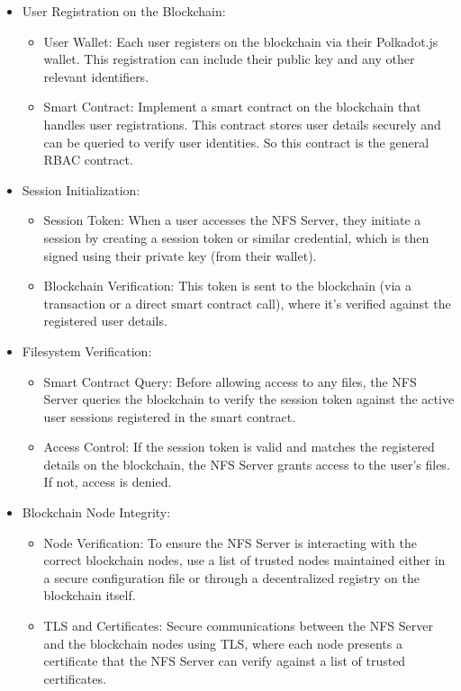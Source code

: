 \documentclass{tufte-handout}
\begin{document}
\begin{itemize}
\item User Registration on the Blockchain:
\begin{itemize}
    \item User Wallet: Each user registers on the blockchain via their Polkadot.js wallet. This registration can include their public key and any other relevant identifiers.
    \item Smart Contract: Implement a smart contract on the blockchain that handles user registrations. This contract stores user details securely and can be queried to
verify user identities. So this contract is the general RBAC contract.
\end{itemize}
\item Session Initialization:
\begin{itemize}
    \item Session Token: When a user accesses the NFS Server, they initiate a session by creating a session token or similar credential, which is then signed using their
    private key (from their wallet).
    \item Blockchain Verification: This token is sent to the blockchain (via a transaction or a direct smart contract call), where it's verified against the registered
    user details.
\end{itemize}
\item Filesystem Verification:
\begin{itemize}
    \item Smart Contract Query: Before allowing access to any files, the NFS Server queries the blockchain to verify the session token against the active user sessions
    registered in the smart contract.
    \item Access Control: If the session token is valid and matches the registered details on the blockchain, the NFS Server grants access to the user's files. If not,
    access is denied.
\end{itemize}
\item Blockchain Node Integrity:
\begin{itemize}
    \item Node Verification: To ensure the NFS Server is interacting with the correct blockchain nodes, use a list of trusted nodes maintained either in a secure
    configuration file or through a decentralized registry on the blockchain itself.
    \item TLS and Certificates: Secure communications between the NFS Server and the blockchain nodes using TLS, where each node presents a certificate that the NFS
    Server can verify against a list of trusted certificates.
\end{itemize}
\end{itemize}
\end{document}
